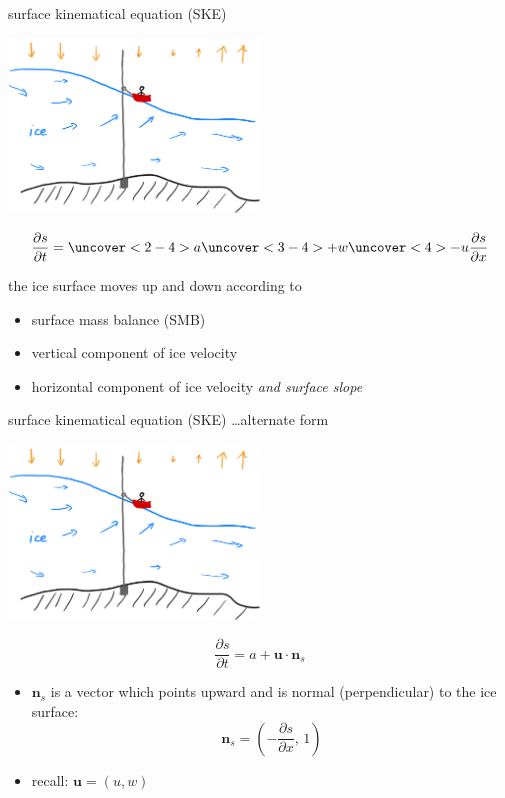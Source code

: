 \documentclass[10pt,dvipsnames]{beamer}
\newcommand{\bn}{\mathbf{n}}
\newcommand{\bu}{\mathbf{u}}
\begin{document}
\begin{frame}{surface kinematical equation (SKE)}
\begin{center}
\includegraphics[width=0.5\textwidth]{boatplus}
\end{center}

\vspace{-5mm}
\begin{equation*}
\frac{\partial s}{\partial t} = \uncover<2-4>{a} \uncover<3-4>{+w} \uncover<4>{-u \frac{\partial s}{\partial x}}
\end{equation*}

the ice surface moves up and down according to
\begin{itemize}
\item<2-4> surface mass balance (SMB)
\item<3-4> vertical component of ice velocity
\item<4> horizontal component of ice velocity \emph{and surface slope}
\end{itemize}
\end{frame}

\begin{frame}{surface kinematical equation (SKE) \dots alternate form}
\begin{center}
\includegraphics[width=0.5\textwidth]{boatplus}
\end{center}

\vspace{-5mm}
\begin{equation*}
\frac{\partial s}{\partial t} = a + \bu \cdot \bn_s
\end{equation*}

\begin{itemize}
\item $\bn_s$ is a vector which points upward and is normal (perpendicular) to the ice surface:
	$$\bn_s = \left(-\frac{\partial s}{\partial x}, \,1\right)$$
\item recall: $\bu=(u,w)$
\end{itemize}
\end{frame}
\end{document}
